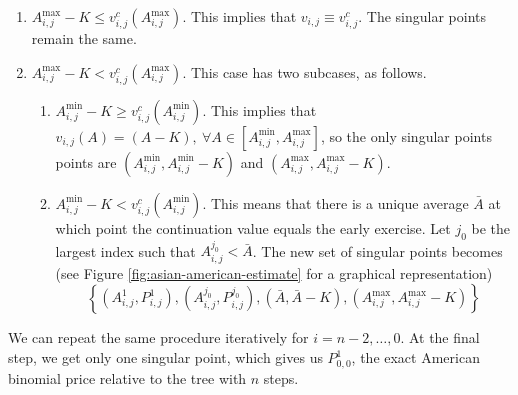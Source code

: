 \begin{enumerate}
	\item $ A_{i,j}^{\max} - K  \le  v_{i,j}^c ( A_{i,j}^{\max} ) $. This implies that $ v_{i,j} \equiv v_{i,j}^c $. The singular points remain the same.
	\item $ A_{i,j}^{\max} - K  <  v_{i,j}^c ( A_{i,j}^{\max} ) $. This case has two subcases, as follows.
	\begin{enumerate}
		\item $ A_{i,j}^{\min} - K  \ge  v_{i,j}^c ( A_{i,j}^{\min} ) $. This implies that $ v_{i,j} (A) = (A - K), \  \forall A \in [ A_{i,j}^{\min}, A_{i,j}^{\max} ] $, so the only singular points points are $ \left(  A_{i,j}^{\min}, A_{i,j}^{\min} - K  \right) $ and $ \left(  A_{i,j}^{\max}, A_{i,j}^{\max} - K  \right) $.
		\item $ A_{i,j}^{\min} - K  <  v_{i,j}^c ( A_{i,j}^{\min} ) $. This means that there is a unique average $ \bar{A} $ at which point the continuation value equals the early exercise. Let $ j_0 $ be the largest index such that $ A_{i,j}^{j_0} < \bar{A} $. The new set of singular points becomes (see Figure \ref{fig:asian-american-estimate} for a graphical representation)
		\begin{equation*}
			\left\lbrace  \left( A_{i,j}^{1}, P_{i,j}^{1} \right), \left( A_{i,j}^{j_0}, P_{i,j}^{j_0} \right), \left( \bar{A}, \bar{A} - K \right), \left( A_{i,j}^{\max}, A_{i,j}^{\max} - K \right)  \right\rbrace
		\end{equation*}
	\end{enumerate}
\end{enumerate}

We can repeat the same procedure iteratively for $ i = n-2, \dots, 0 $. At the final step, we get only one singular point, which gives us $ P_{0,0}^1 $, the exact American binomial price relative to the tree with $ n $ steps.

